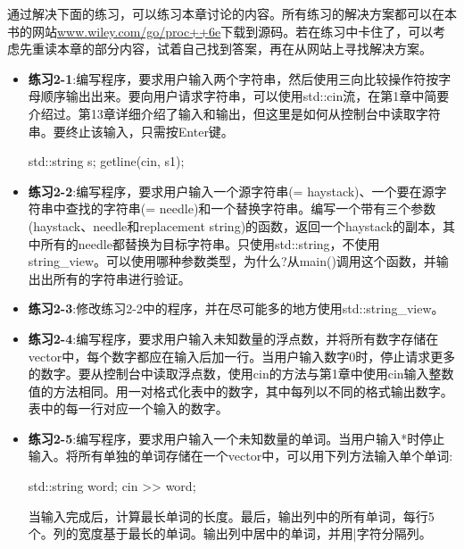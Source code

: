
通过解决下面的练习，可以练习本章讨论的内容。所有练习的解决方案都可以在本书的网站\url{www.wiley.com/go/proc++6e}下载到源码。若在练习中卡住了，可以考虑先重读本章的部分内容，试着自己找到答案，再在从网站上寻找解决方案。

\begin{itemize}
\item
\textbf{练习2-1}:编写程序，要求用户输入两个字符串，然后使用三向比较操作符按字母顺序输出出来。要向用户请求字符串，可以使用std::cin流，在第1章中简要介绍过。第13章详细介绍了输入和输出，但这里是如何从控制台中读取字符串。要终止该输入，只需按Enter键。

\begin{cpp}
std::string s;
getline(cin, s1);
\end{cpp}

\item
\textbf{练习2-2}:编写程序，要求用户输入一个源字符串(= haystack)、一个要在源字符串中查找的字符串(= needle)和一个替换字符串。编写一个带有三个参数(haystack、needle和replacement string)的函数，返回一个haystack的副本，其中所有的needle都替换为目标字符串。只使用std::string，不使用string\_view。可以使用哪种参数类型，为什么?从main()调用这个函数，并输出出所有的字符串进行验证。

\item
\textbf{练习2-3}:修改练习2-2中的程序，并在尽可能多的地方使用std::string\_view。

\item
\textbf{练习2-4}:编写程序，要求用户输入未知数量的浮点数，并将所有数字存储在vector中，每个数字都应在输入后加一行。当用户输入数字0时，停止请求更多的数字。要从控制台中读取浮点数，使用cin的方法与第1章中使用cin输入整数值的方法相同。用一对格式化表中的数字，其中每列以不同的格式输出数字。表中的每一行对应一个输入的数字。

\item
\textbf{练习2-5}:编写程序，要求用户输入一个未知数量的单词。当用户输入*时停止输入。将所有单独的单词存储在一个vector中，可以用下列方法输入单个单词:

\begin{cpp}
std::string word;
cin >> word;
\end{cpp}

当输入完成后，计算最长单词的长度。最后，输出列中的所有单词，每行5个。列的宽度基于最长的单词。输出列中居中的单词，并用|字符分隔列。
\end{itemize}


